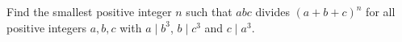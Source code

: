 Find the smallest positive integer $n$ such that $abc$ divides $(a+b+c)^n$ for all positive integers $a,b,c$ with $a\mid b^3$, $b\mid c^3$ and $c\mid a^3$.
